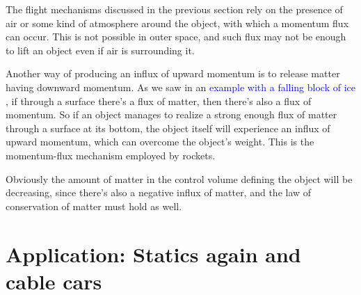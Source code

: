\documentclass[a4paper,12pt,%
onecolumn,oneside,%
british%
]{memoir}
\renewcommand*{\bm}[1]{\textpdfrender{TextRenderingMode=2,LineWidth=0.2pt}{\boldsymbol{#1}}}
\renewcommand*{\|}[1][]{\nonscript\:#1\vert\nonscript\:\mathopen{}}
\newcommand*{\sect}{\S}%
\renewcommand*{\autoref}[3][\sect\,\ref]{\textcolor{blue}{#3}
\raisebox{0.6ex}{\color{blue}\miniscule%
\faIcon{angle-right}%
\;#1{#2}\;p.\,\pageref{#2}}}
\newcommand*{\yvs}{\bm{v}_{\textrm{s}}}
\newcommand*{\yJ}{J}
\newcommand*{\yrho}{\rho}
\begin{document}
The flight mechanisms discussed in the previous section rely on the presence of air or some kind of atmosphere around the object, with which a momentum flux can occur. This is not possible in outer space, and such flux may not be enough to lift an object even if air is surrounding it.

Another way of producing an influx of upward momentum is to release matter having downward momentum. As we saw in an \autoref{sec:example_balance_static}{example with a falling block of ice}, if through a surface there's a flux of matter, then there's also a flux of momentum. So if an object manages to realize a strong enough flux of matter through a surface at its bottom, the object itself will experience an influx of upward momentum, which can overcome the object's weight. This is the momentum-flux mechanism employed by rockets.

Obviously the amount of matter in the control volume defining the object will be decreasing, since there's also a negative influx of matter, and the law of conservation of matter must hold as well.

%



\section{Application: Statics again and cable cars}
\label{sec:bal_momentum_cablecar}
\end{document}
